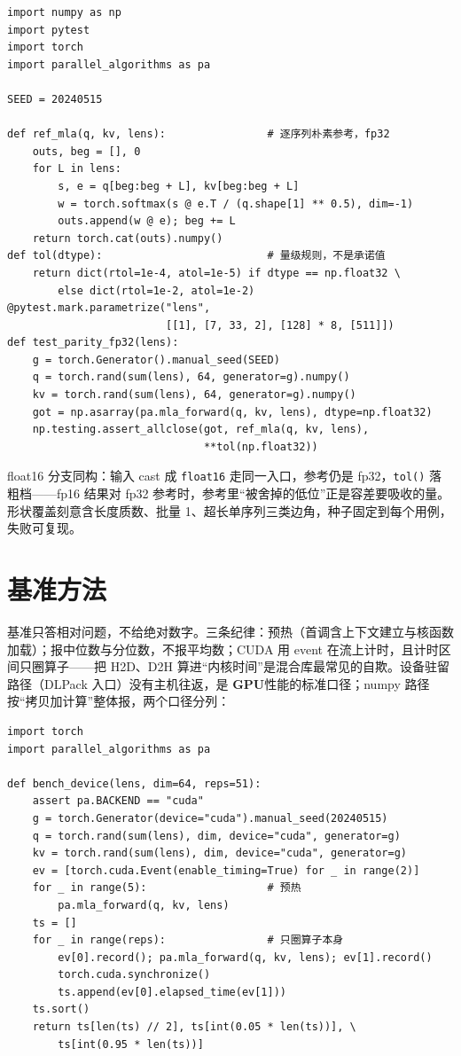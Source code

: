 \documentclass[12pt,a4paper,fontset=fandol]{ctexbook}
\newcommand{\Fn}[1]{\texttt{#1()}}
\newcommand{\Tp}[1]{\texttt{#1}}
\newcommand{\Dom}[1]{\textsf{\bfseries #1}}
\newcommand{\GPU}{\Dom{GPU}}
\begin{document}
\begin{lstlisting}[style=pythonstyle,caption={tests/test\_parity.py（节选）：对拍骨架}]
import numpy as np
import pytest
import torch
import parallel_algorithms as pa

SEED = 20240515

def ref_mla(q, kv, lens):                # 逐序列朴素参考，fp32
    outs, beg = [], 0
    for L in lens:
        s, e = q[beg:beg + L], kv[beg:beg + L]
        w = torch.softmax(s @ e.T / (q.shape[1] ** 0.5), dim=-1)
        outs.append(w @ e); beg += L
    return torch.cat(outs).numpy()
def tol(dtype):                          # 量级规则，不是承诺值
    return dict(rtol=1e-4, atol=1e-5) if dtype == np.float32 \
        else dict(rtol=1e-2, atol=1e-2)
@pytest.mark.parametrize("lens",
                         [[1], [7, 33, 2], [128] * 8, [511]])
def test_parity_fp32(lens):
    g = torch.Generator().manual_seed(SEED)
    q = torch.rand(sum(lens), 64, generator=g).numpy()
    kv = torch.rand(sum(lens), 64, generator=g).numpy()
    got = np.asarray(pa.mla_forward(q, kv, lens), dtype=np.float32)
    np.testing.assert_allclose(got, ref_mla(q, kv, lens),
                               **tol(np.float32))
\end{lstlisting}
float16 分支同构：输入 cast 成 \Tp{float16} 走同一入口，参考仍是 fp32，\Fn{tol} 落粗档——fp16 结果对 fp32 参考时，参考里``被舍掉的低位''正是容差要吸收的量。形状覆盖刻意含长度质数、批量 1、超长单序列三类边角，种子固定到每个用例，失败可复现。

\section{基准方法}

基准只答相对问题，不给绝对数字。三条纪律：预热（首调含上下文建立与核函数加载）；报中位数与分位数，不报平均数；CUDA 用 event 在流上计时，且计时区间只圈算子——把 H2D、D2H 算进``内核时间''是混合库最常见的自欺。设备驻留路径（DLPack 入口）没有主机往返，是 \GPU{}性能的标准口径；numpy 路径按``拷贝加计算''整体报，两个口径分列：

\begin{lstlisting}[style=pythonstyle,caption={bench/mla\_bench.py（节选）：event 计时}]
import torch
import parallel_algorithms as pa

def bench_device(lens, dim=64, reps=51):
    assert pa.BACKEND == "cuda"
    g = torch.Generator(device="cuda").manual_seed(20240515)
    q = torch.rand(sum(lens), dim, device="cuda", generator=g)
    kv = torch.rand(sum(lens), dim, device="cuda", generator=g)
    ev = [torch.cuda.Event(enable_timing=True) for _ in range(2)]
    for _ in range(5):                   # 预热
        pa.mla_forward(q, kv, lens)
    ts = []
    for _ in range(reps):                # 只圈算子本身
        ev[0].record(); pa.mla_forward(q, kv, lens); ev[1].record()
        torch.cuda.synchronize()
        ts.append(ev[0].elapsed_time(ev[1]))
    ts.sort()
    return ts[len(ts) // 2], ts[int(0.05 * len(ts))], \
        ts[int(0.95 * len(ts))]
\end{lstlisting}
\end{document}
